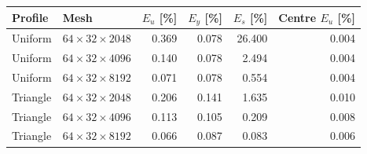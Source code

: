 \begin{tabular}{llrrrr}
\toprule
Profile & Mesh & $E_u$ [\%] & $E_y$ [\%] & $E_s$ [\%] & Centre $E_u$ [\%] \\
\midrule
Uniform & $64\times32\times2048$ & 0.369 & 0.078 & 26.400 & 0.004 \\
Uniform & $64\times32\times4096$ & 0.140 & 0.078 & 2.494 & 0.004 \\
Uniform & $64\times32\times8192$ & 0.071 & 0.078 & 0.554 & 0.004 \\
Triangle & $64\times32\times2048$ & 0.206 & 0.141 & 1.635 & 0.010 \\
Triangle & $64\times32\times4096$ & 0.113 & 0.105 & 0.209 & 0.008 \\
Triangle & $64\times32\times8192$ & 0.066 & 0.087 & 0.083 & 0.006 \\
\bottomrule
\end{tabular}
